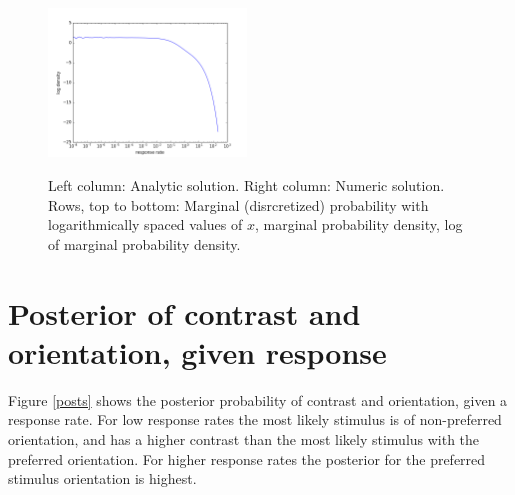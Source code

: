 \documentclass{scrartcl}
\begin{document}
\begin{figure}[h]
\includegraphics[width=0.47\textwidth, clip]{../pics/s2/margXLogDens_numeric_final}\\
\caption{Left column: Analytic solution. Right column: Numeric solution. Rows, top to bottom: Marginal (disrcretized) probability with logarithmically spaced values of $x$, marginal probability density, log of marginal probability density.}
\label{margs}
\end{figure}

\section{Posterior of contrast and orientation, given response}

Figure \ref{posts} shows the posterior probability of contrast and orientation, given a response rate. For low response rates the most likely stimulus is of non-preferred orientation, and has a higher contrast than the most likely stimulus with the preferred orientation. For higher response rates the posterior for the preferred stimulus orientation is highest.
\end{document}
